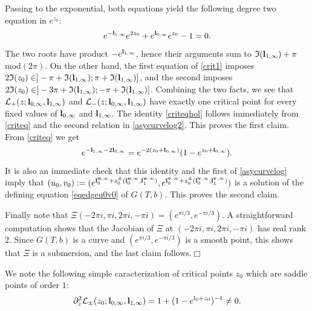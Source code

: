 \documentclass[11pt]{amsart}
\newcommand{\cvd}{\hfill$\Box$}
\newcommand{\bu}{{\bf u}}
\newcommand{\bv}{{\bf v}}
\newcommand{\bl}{{\bf l}}
\def\cvd{\hfill$\Box$}
\begin{document}
{\begin{equation}
\end{equation}
Passing to the exponential, both equations yield the following degree two equation in $e^{z_0}$:
\begin{equation}\label{criteq}
e^{-\bl_{1,\infty}}e^{2z_0} +e^{\bl_{0,\infty}}e^{z_0}-1=0.
\end{equation}
The two roots have product $-e^{\bl_{1,\infty}}$, hence their arguments sum to $\mathfrak{I}(\bl_{1,\infty})+\pi$ mod$(2\pi)$. On the other hand, the first equation of \eqref{crit1} imposes $2\mathfrak{I}(z_0)\in ]-\pi+\mathfrak{I}(\bl_{1,\infty});\pi+\mathfrak{I}(\bl_{1,\infty})]$, and the second imposes $2\mathfrak{I}(z_0)\in ]-3\pi+\mathfrak{I}(\bl_{1,\infty});-\pi+\mathfrak{I}(\bl_{1,\infty})]$. Combining the two facts, we see that $\mathcal{L}_+(z;\bl_{0,\infty},\bl_{1,\infty})$ and $\mathcal{L}_-(z;\bl_{0,\infty},\bl_{1,\infty})$ have exactly one critical point for every fixed values of $\bl_{0,\infty}$ and $\bl_{1,\infty}$. The identity \eqref{criteqhol} follows immediately from \eqref{criteq} and the second relation in \eqref{asycurvelog2}. This proves the first claim. \\
From \eqref{criteq} we get
\begin{equation}\label{criteq2oct24}
e^{-\bl_{1,\infty}-2\bl_{0,\infty}} = e^{-2(z_0+\bl_{0,\infty})}(1-e^{z_0+\bl_{0,\infty}}).
\end{equation}
It is also an immediate check that this identity and the first of \eqref{asycurvelog} imply that $(u_0,v_0):=(e^{\bl_0^{\bu,\infty}+z_0^\pm(\bl_0^{\bu,\infty}, \bl_1^{\bu,\infty})},e^{\bl_0^{\bv,\infty}+z_0^\pm(\bl_0^{\bv,\infty}, \bl_1^{\bv,\infty})})$ is a solution of the defining equation \eqref{eqedgeu0v0} of $G(T,b)$. This proves the second claim.
 
 Finally note that $\Xi(-2\pi i, \pi i,2\pi i, -\pi i) = (e^{\pi i/3}, e^{- \pi i/3})$. A straightforward computation shows that the Jacobian of $\Xi$ at $(-2\pi i, \pi i,2\pi i, -\pi i)$ has real rank $2$. Since $G(T,b)$ is a curve and $(e^{\pi i/3}, e^{- \pi i/3})$ is a smooth point, this shows that $\Xi$ is a submersion, and the last claim follows.\cvd
\medskip

We note the following simple caracterization of critical points $z_0$ which are saddle points of order $1$:
$$\partial_z^2\mathcal{L}_\pm(z_0;\bl_{0,\infty},\bl_{1,\infty}) = 1+(1-e^{{\rm l}_0 +z_0})^{-1} \ne 0.$$

}
\end{document}
